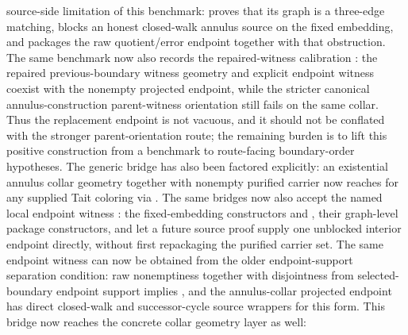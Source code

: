 \documentclass[11pt]{article}
\begin{document}
source-side limitation of this benchmark:
 proves that its graph is a three-edge matching,
 blocks an
honest closed-walk annulus source on the fixed embedding, and
packages the raw quotient/error endpoint together with that obstruction.  The
same benchmark now also records the
repaired-witness calibration
:
the repaired previous-boundary witness geometry and explicit endpoint witness
coexist with the nonempty projected endpoint, while the stricter canonical
annulus-construction parent-witness orientation still fails on the same collar.
Thus the replacement endpoint is not vacuous, and it should not be conflated
with the stronger parent-orientation route; the remaining burden is to lift
this positive construction from a benchmark to route-facing boundary-order
hypotheses.  The generic bridge has
also been factored explicitly: an existential annulus collar geometry together
with nonempty purified carrier now reaches
 for any supplied Tait
coloring via
.
The same bridges now also accept the named local endpoint witness
: the fixed-embedding constructors
and
,
their graph-level package constructors, and
let a future source proof supply one unblocked interior endpoint directly,
without first repackaging the purified carrier set.
The same endpoint witness can now be obtained from the older endpoint-support
separation condition: raw  nonemptiness
together with disjointness from selected-boundary endpoint support implies
, and the annulus-collar projected endpoint
has direct closed-walk and successor-cycle source wrappers for this form.
This bridge now reaches the concrete collar geometry layer as well:
\end{document}
